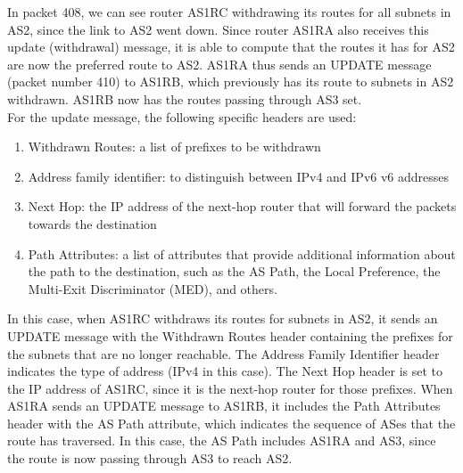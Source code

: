 In packet 408, we can see router AS1RC withdrawing its routes for all subnets in AS2, since the link to AS2 went down. Since router AS1RA also receives this update (withdrawal) message, it is able to compute that the routes it has for AS2 are now the preferred route to AS2. AS1RA thus sends an UPDATE message (packet number 410) to AS1RB, which previously has its route to subnets in AS2 withdrawn. AS1RB now has the routes passing through AS3 set.\\

For the update message, the following specific headers are used:
\begin{enumerate}
    \item Withdrawn Routes: a list of prefixes to be withdrawn
    \item Address family identifier: to distinguish between IPv4 and IPv6 v6 addresses
    \item Next Hop: the IP address of the next-hop router that will forward the packets towards the destination
    \item Path Attributes: a list of attributes that provide additional information about the path to the destination, such as the AS Path, the Local Preference, the Multi-Exit Discriminator (MED), and others.
\end{enumerate}
In this case, when AS1RC withdraws its routes for subnets in AS2, it sends an UPDATE message with the Withdrawn Routes header containing the prefixes for the subnets that are no longer reachable. The Address Family Identifier header indicates the type of address (IPv4 in this case). The Next Hop header is set to the IP address of AS1RC, since it is the next-hop router for those prefixes.
When AS1RA sends an UPDATE message to AS1RB, it includes the Path Attributes header with the AS Path attribute, which indicates the sequence of ASes that the route has traversed. In this case, the AS Path includes AS1RA and AS3, since the route is now passing through AS3 to reach AS2. 

